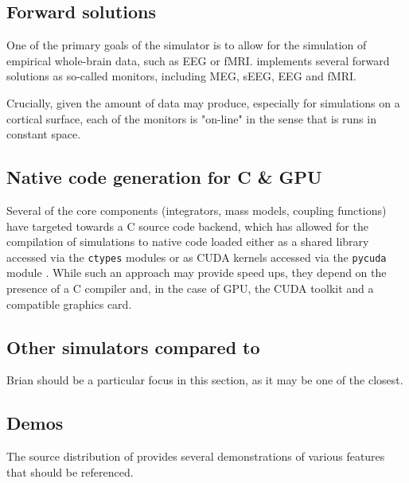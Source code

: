 \subsection{Forward solutions}

	One of the primary goals of the \TVB simulator is to allow for the
	simulation of empirical whole-brain data, such as EEG or fMRI.
	\TVB implements several forward solutions as so-called monitors, 
	including MEG, sEEG, EEG and fMRI. 

	Crucially, given the amount of data \TVB may produce, especially for
	simulations on a cortical surface, each of the monitors is "on-line"
	in the sense that is runs in constant space.

\subsection{Native code generation for C \& GPU}

	Several of the core components (integrators, mass models, coupling
	functions) have targeted towards a C source code backend, which has
	allowed for the compilation of simulations to native code loaded 
	either as a shared library accessed via the \texttt{ctypes} modules
	or as CUDA kernels accessed via the \texttt{pycuda} module \cite{pycuda}.
	While such an approach may provide speed ups, they depend on the
	presence of a C compiler and, in the case of GPU, the CUDA toolkit and
	a compatible graphics card. 


\subsection{Other simulators compared to \TVB}

	Brian should be a particular focus in this section, as it may
	be one of the closest. 

\subsection{Demos}

	The source distribution of \TVB provides several demonstrations of
	various features that should be referenced.

